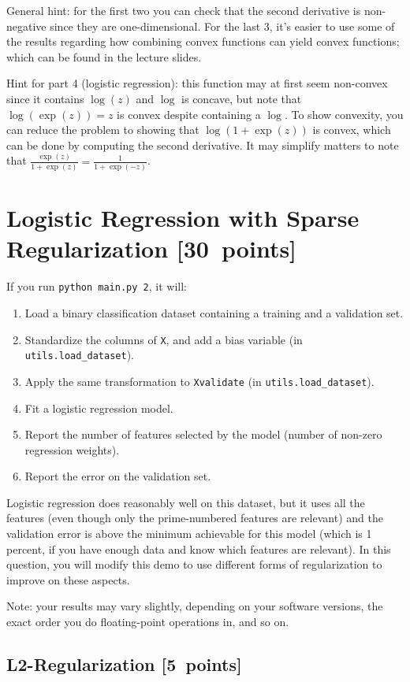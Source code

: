 \documentclass{article}
\newcommand\pts[1]{\textcolor{pointscolour}{[#1~points]}}
\begin{document}
General hint: for the first two you can check that the second derivative is non-negative since they are one-dimensional. For the last 3, it's easier to use some of the results regarding how combining convex functions can yield convex functions; which can be found in the lecture slides.

Hint for part 4 (logistic regression): this function may at first seem non-convex since it contains $\log(z)$ and $\log$ is concave, but note that $\log(\exp(z))=z$ is convex despite containing a $\log$. To show convexity, you can reduce the problem to showing that $\log(1+\exp(z))$ is convex, which can be done by computing the second derivative. It may simplify matters to note that $\frac{\exp(z)}{1+\exp(z)} = \frac{1}{1+\exp(-z)}$.


\clearpage
\section{Logistic Regression with Sparse Regularization \pts{30}}

If you run  \verb|python main.py 2|, it will:
\begin{enumerate}
\item Load a binary classification dataset containing a training and a validation set.
\item Standardize the columns of \verb|X|, and add a bias variable (in \verb|utils.load_dataset|).
\item Apply the same transformation to \verb|Xvalidate| (in \verb|utils.load_dataset|).
\item Fit a logistic regression model.
\item Report the number of features selected by the model (number of non-zero regression weights).
\item Report the error on the validation set.
\end{enumerate}
Logistic regression does reasonably well on this dataset,
but it uses all the features (even though only the prime-numbered features are relevant)
and the validation error is above the minimum achievable for this model
(which is 1 percent, if you have enough data and know which features are relevant).
In this question, you will modify this demo to use different forms of regularization
 to improve on these aspects.

Note: your results may vary slightly, depending on your software versions, the exact order you do floating-point operations in, and so on.


\subsection{L2-Regularization \pts{5}}
\end{document}

